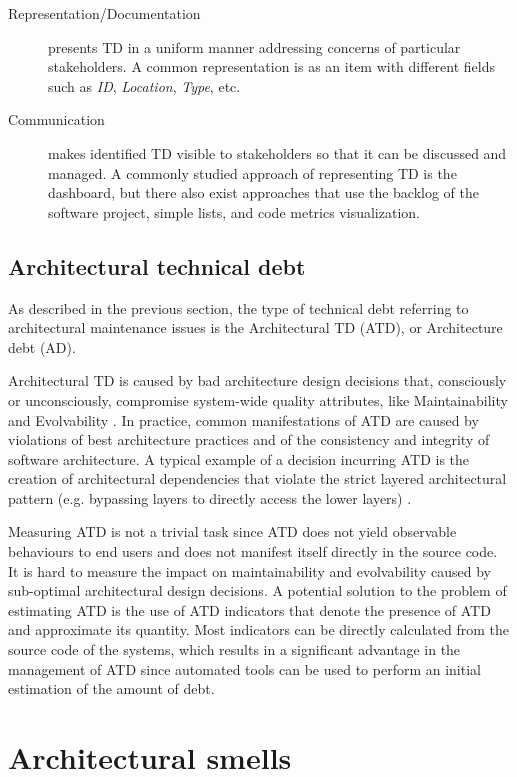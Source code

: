\begin{description}
    \item[Representation/Documentation] presents TD in a uniform manner addressing concerns of particular stakeholders. A common representation is as an item with different fields such as \textit{ID}, \textit{Location}, \textit{Type}, etc.

    \item[Communication] makes identified TD visible to stakeholders so that it can be discussed and managed. A commonly studied approach of representing TD is the dashboard, but there also exist approaches that use the backlog of the software project, simple lists, and code metrics visualization.
\end{description}

\subsection{Architectural technical debt}
As described in the previous section, the type of technical debt referring to architectural maintenance issues is the Architectural TD (ATD), or Architecture debt (AD).

Architectural TD is caused by bad architecture design decisions that, consciously or unconsciously, compromise system-wide quality attributes, like Maintainability and Evolvability \cite{kruchten_technical_2012}.
In practice, common manifestations of ATD are caused by violations of best architecture practices and of the consistency and integrity of software architecture.
A typical example of a decision incurring ATD is the creation of architectural dependencies that violate the strict layered architectural pattern (e.g. bypassing layers to directly access the lower layers) \cite{Li2014}.

Measuring ATD is not a trivial task since ATD does not yield observable behaviours to end users \cite{brown_managing_2010} and does not manifest itself directly in the source code.
It is hard to measure the impact on maintainability and evolvability caused by sub-optimal architectural design decisions.
A potential solution to the problem of estimating ATD is the use of ATD indicators that denote the presence of ATD and approximate its quantity.
Most indicators can be directly calculated from the source code of the systems, which results in a significant advantage in the management of ATD since automated tools can be used to perform an initial estimation of the amount of debt.

\section{Architectural smells}

